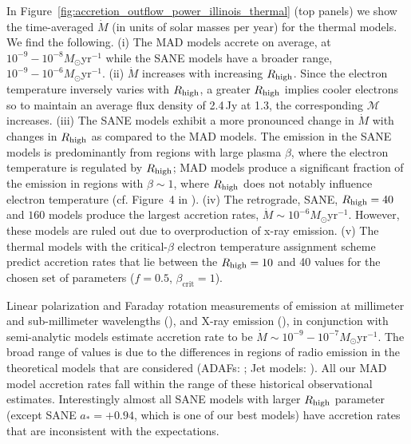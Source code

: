 In Figure~\ref{fig:accretion_outflow_power_illinois_thermal} (top panels) we show the time-averaged $\dot{M}$ (in units of solar masses per year) for the \kharma thermal models. We find the following. (i) The MAD models accrete on average, at $10^{-9}-10^{-8} M_{\odot}$yr$^{-1}$ while the SANE models have a broader range, $10^{-9}-10^{-6} M_{\odot}$yr$^{-1}$. (ii) $\dot{M}$ increases with increasing $R_\mathrm{high}$. Since the electron temperature inversely varies with $R_\mathrm{high}$, a greater $R_\mathrm{high}$ implies cooler electrons so to maintain an average flux density of 2.4\,Jy at 1.3\mm, the corresponding $\mathcal{M}$ increases. (iii) The SANE models exhibit a more pronounced change in $\dot{M}$ with changes in $R_\mathrm{high}$ as compared to the MAD models. The emission in the SANE models is predominantly from regions with large plasma $\beta$, where the electron temperature is regulated by $R_\mathrm{high}$; MAD models produce a significant fraction of the emission in regions with $\beta\sim 1$, where $R_\mathrm{high}$ does not notably influence electron temperature (cf. Figure~4 in ). (iv) The retrograde, SANE, $R_\mathrm{high}=40$ and $160$ models produce the largest accretion rates, $\dot{M}\sim 10^{-6}M_{\odot}$yr$^{-1}$. However, these models are ruled out due to overproduction of x-ray emission. (v) The thermal models with the critical-$\beta$ electron temperature assignment scheme predict accretion rates that lie between the $R_\mathrm{high}=10$ and 40 values for the chosen set of parameters ($f=0.5$, $\beta_\mathrm{crit}=1$).
\color{red}{\bf please add if bhac confirms this general trends. add figure but it would be best to plot this all together using maybe more transparent lines for bhac sims in the existing figure.}
\color{black}

Linear polarization and Faraday rotation measurements of \sgra emission at millimeter and sub-millimeter wavelengths (\citealt{2000ApJ...538L.121A, 2000ApJ...545..842Q, 2003ApJ...588..331B, 2006ApJ...640..308M, 2006JPhCS..54..354M, 2006ApJ...646L.111M}), and X-ray emission (\citealt{2003ApJ...591..891B, doi:10.1126/science.1240755}), in conjunction with semi-analytic models estimate \sgra accretion rate to be $\dot{M} \sim 10^{-9} - 10^{-7} M_{\odot}$yr$^{-1}$. The broad range of values is due to the differences in regions of radio emission in the theoretical models that are considered (ADAFs: \citealt{1998ApJ...492..554N, Yuan_2003}; Jet models: \citealt{1993A&A...278L...1F, 2000A&A...362..113F}). All our MAD model accretion rates  fall within the range of these historical observational estimates. Interestingly almost all SANE models with larger $R_\mathrm{high}$ parameter (except SANE $a_*=+0.94$, which is one of our best models) have accretion rates that are inconsistent with the expectations.

